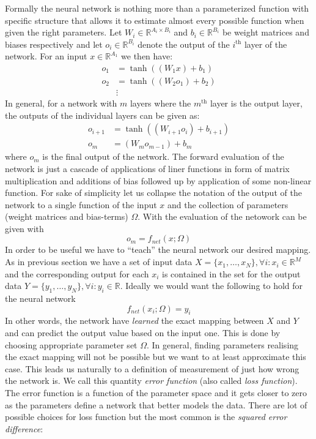 \documentclass[12pt,a4paper,twoside]{scrartcl}
\numberwithin{equation}{section}
\begin{document}
Formally the neural network is nothing more than a parameterized function with specific structure that allows it to estimate almost every possible function when given the right parameters. Let \(W_i \in \mathbb{R}^{A_i \times B_i }\) and \(b_i\in\mathbb{R}^{B_i}\) be weight matrices and biases respectively and let \(o_i\in\mathbb{R}^{B_i}\) denote the output of the \(i^\text{th}\) layer of the network. For an input \(x\in \mathbb{R}^{A_1}\) we then have:
\begin{align}
  o_{1} &= \tanh((W_{1}x) + b_{1}) \\
  o_{2} &= \tanh((W_{2}o_1) + b_{2}) \\
        &\vdots
\end{align}
In general, for a network with \(m\) layers where the \(m^{\text{th}}\) layer is the output layer, the outputs of the individual layers can be given as:
\begin{align}
  \label{eq:nn-ouput}
  o_{i+1}  &= \tanh((W_{i+1}o_i) + b_{i+1}) \\
  o_m     &= (W_{m}o_{m-1}) + b_{m}
\end{align}
where \(o_m \) is the final output of the network. The forward evaluation of the network is just a cascade of applications of liner functions in form of matrix multiplication and additions of bias followed up by application of some non-linear function. For sake of simplicity let us collapse the notation of the output of the network to a single function of the input \(x\) and the collection of parameters (weight matrices and bias-terms) \(\Omega\). With the evaluation of the netowork can be given with
\begin{equation}
    o_m = f_{net}(x; \Omega)
\end{equation}
In order to be useful we have to ``teach'' the neural network our desired mapping. As in previous section we have a set of input data \(X = \{x_1,\ldots , x_N\}, \forall i : x_i\in\mathbb{R}^M\) and the corresponding output for each \(x_i\) is contained in the set for the output data \(Y = \{y_1,\ldots ,y_N\}, \forall i : y_i\in\mathbb{R}\). Ideally we would want the following to hold for the neural network
\begin{equation}
  f_{net}(x_i;\Omega) = y_i
\end{equation}
In other words, the network have \emph{learned} the exact mapping between \(X\) and \(Y\) and can predict the output value based on the input one. This is done by choosing appropriate parameter set \(\Omega\). In general, finding parameters realising the exact mapping will not be possible but we want to at least approximate this case. This leads us naturally to a definition of measurement of just how wrong the network is. We call this quantity \emph{error function} (also called \emph{loss function}). The error function is a function of the parameter space and it gets closer to zero as the parameters define a network that better models the data. There are lot of possible choices for loss function but the most common is the \emph{squared error difference}:
\end{document}
